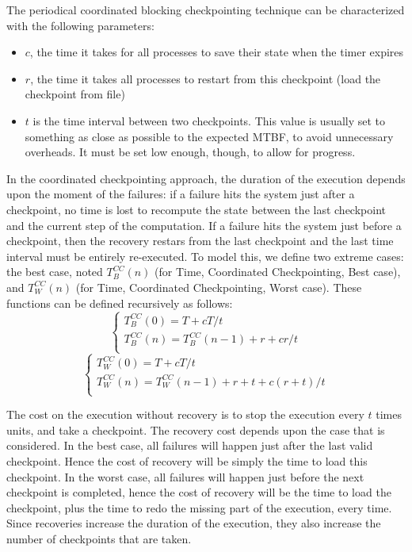 The periodical coordinated blocking checkpointing technique can be
characterized with the following parameters:
\begin{itemize}
\item $c$, the time it takes for all processes to save their state
  when the timer expires
\item $r$, the time it takes all processes to restart from this
  checkpoint (load the checkpoint from file)
\item $t$ is the time interval between two checkpoints. This value is
  usually set to something as close as possible to the expected MTBF,
  to avoid unnecessary overheads. It must be set low enough, though,
  to allow for progress.
\end{itemize}
In the coordinated checkpointing approach, the duration of the
execution depends upon the moment of the failures: if a failure hits
the system just after a checkpoint, no time is lost to recompute the
state between the last checkpoint and the current step of the
computation. If a failure hits the system just before a checkpoint,
then the recovery restars from the last checkpoint and the last
time interval must be entirely re-executed. To model this, we define
two extreme cases: the best case, noted $T^{CC}_B(n)$ (for Time,
Coordinated Checkpointing, Best case), and $T^{CC}_W(n)$ (for Time,
Coordinated Checkpointing, Worst case). These functions can be defined
recursively as follows:
$$
\left\{\begin{array}{l}
T^{CC}_B(0) = T + c T/t\\
T^{CC}_B(n) = T^{CC}_B(n-1) + r + c r/t\\
\end{array}\right.$$
$$\left\{\begin{array}{l}
T^{CC}_W(0) = T + c T/t\\
T^{CC}_W(n) = T^{CC}_W(n-1) + r + t+ c (r+t)/t\\
\end{array}\right.
$$

The cost on the execution without recovery is to stop the execution
every $t$ times units, and take a checkpoint. The recovery cost
depends upon the case that is considered. In the best case, all
failures will happen just after the last valid checkpoint. Hence the
cost of recovery will be simply the time to load this checkpoint. In
the worst case, all failures will happen just before the next
checkpoint is completed, hence the cost of recovery will be the time
to load the checkpoint, plus the time to redo the missing part of the
execution, every time. Since recoveries increase the duration of the
execution, they also increase the number of checkpoints that are
taken.

